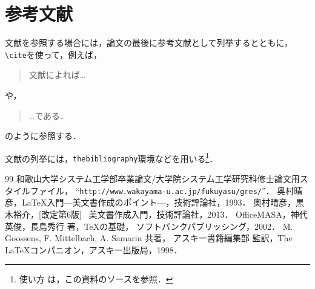 \documentclass[11pt]{jreport}
\begin{document}
\chapter{参考文献}

文献を参照する場合には，論文の最後に参考文献として列挙するとともに，
\verb|\cite|を使って，例えば，
\begin{quote}
  文献\cite{latex}によれば…
\end{quote}
や，
\begin{quote}
  …である\cite{latex2e}．
\end{quote}
のように参照する．

文献の列挙には，{\tt thebibliography}環境などを用いる\footnote{使い方
は，この資料のソースを参照．}．




\begin{thebibliography}{99}
    和歌山大学システム工学部卒業論文/大学院システム工学研究科修士論文用スタイルファイル，
    ``{\tt http://www.wakayama-u.ac.jp/fukuyasu/gres/}''．
    奥村晴彦，\LaTeX 入門---美文書作成のポイント---，技術評論社，1993．
    奥村晴彦，黒木裕介，[改定第6版] \LaTeXe~美文書作成入門，技術評論社，2013．
    OfficeMASA，神代英俊，長島秀行 著，\TeX の基礎，
    ソフトバンクパブリッシング，2002．
    M. Goossens, F. Mittelbach, A. Samarin 共著，
    アスキー書籍編集部 監訳，The \LaTeX コンパニオン，アスキー出版局，1998．
\end{thebibliography}


% 
% 
% 

\end{document}
